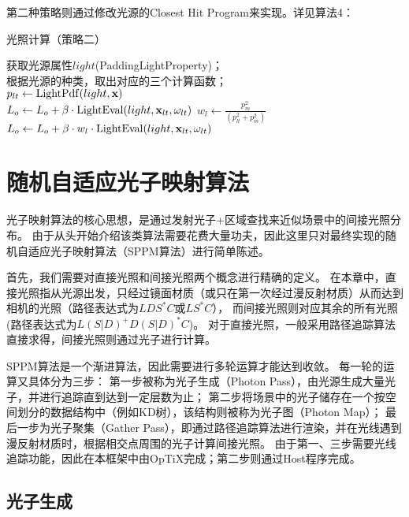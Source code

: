 第二种策略则通过修改光源的Closest Hit Program来实现。详见算法4：
\begin{algorithm}
    \caption{光照计算（策略二）}

    获取光源属性$light$(PaddingLightProperty)；\\
    根据光源的种类，取出对应的三个计算函数；\\
    $p_{lt} \leftarrow {\rm LightPdf}(light, \textbf{x})$\\
    {
        $L_o \leftarrow L_o+\beta\cdot{\rm LightEval}(light, \textbf{x}_{lt}, \omega_{lt}) $
    } 
    {
        $w_l \leftarrow \frac{p_m^2}{(p_{lt}^2+p_m^2)}$\\
        $L_o \leftarrow L_o+\beta\cdot w_l\cdot {\rm LightEval}(light, \textbf{x}_{lt}, \omega_{lt}) $
    }
\end{algorithm}

\section{随机自适应光子映射算法}

光子映射算法的核心思想，是通过发射光子+区域查找来近似场景中的间接光照分布。
由于从头开始介绍该类算法需要花费大量功夫，因此这里只对最终实现的随机自适应光子映射算法（SPPM算法）进行简单陈述。

首先，我们需要对直接光照和间接光照两个概念进行精确的定义。
在本章中，直接光照指从光源出发，只经过镜面材质（或只在第一次经过漫反射材质）从而达到相机的光照（路径表达式为$LDS^*C$或$LS^*C$），
而间接光照则对应其余的所有光照(路径表达式为$L(S|D)^+D(S|D)^*C$)。
对于直接光照，一般采用路径追踪算法直接求得，间接光照则通过光子进行计算。

SPPM算法是一个渐进算法，因此需要进行多轮运算才能达到收敛。
每一轮的运算又具体分为三步：
第一步被称为光子生成（Photon Pass），由光源生成大量光子，并进行追踪直到达到一定层数为止；
第二步将场景中的光子储存在一个按空间划分的数据结构中（例如KD树），该结构则被称为光子图（Photon Map）；
最后一步为光子聚集（Gather Pass），即通过路径追踪算法进行渲染，并在光线遇到漫反射材质时，根据相交点周围的光子计算间接光照。
由于第一、三步需要光线追踪功能，因此在本框架中由OpTiX完成；第二步则通过Host程序完成。

\subsection{光子生成}

